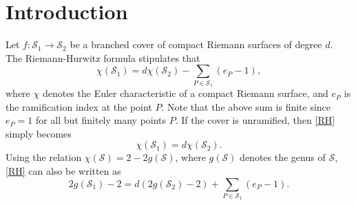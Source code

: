 \documentclass[11pt]{amsart}
\numberwithin{equation}{section}
\theoremstyle{remark}
\begin{document}
\section{Introduction}
Let $f:\mathcal{S}_{1} \rightarrow \mathcal{S}_{2}$ be a branched cover of compact Riemann surfaces of degree $d$.  The Riemann-Hurwitz formula stipulates that
\begin{equation} \label{RH}
\chi(\mathcal{S}_{1}) = d\chi(\mathcal{S}_{2}) - \sum_{P \in \mathcal{S}_{1}}(e_{P} - 1), 
\end{equation}
where $\chi$ denotes the Euler characteristic of a compact Riemann surface, and $e_{P}$ is the ramification index at the point $P$. Note that the above sum is finite since $e_P=1$ for all but finitely many points $P$. If the cover is unramified, then \eqref{RH} simply becomes
\begin{equation} \label{RH_unramified}
\chi(\mathcal{S}_{1}) = d\chi(\mathcal{S}_{2}). 
\end{equation}
Using the relation $\chi(\mathcal{S}) = 2 - 2g(\mathcal{S})$, where $g(\mathcal{S})$ denotes the genus of $\mathcal{S}$, \eqref{RH} can also be written as
\begin{equation} \label{RH_genus}
2g(\mathcal{S}_{1}) - 2 = d(2g(\mathcal{S}_{2}) - 2) +  \sum_{P \in \mathcal{S}_{1}}(e_{P} - 1).
\end{equation}
\end{document}
